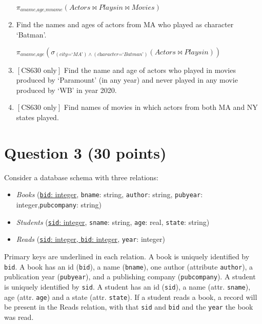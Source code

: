 \documentclass[letterpaper, 11pt]{article}
\begin{document}
\begin{enumerate}[label={\alph*})]
    $\pi_{\textit{aname,age,mname}}(\textit{Actors} \bowtie \textit{Playsin} \bowtie \textit{Movies})$
    
    \item Find the names and ages of actors from MA who played as character `Batman'.

    $\pi_{\textit{aname,age}}(\sigma_{(\textit{city=`MA'})\wedge (\textit{character=`Batman'})}(\textit{Actors} \bowtie \textit{Playsin}))$
    
    \item $\left[\text{CS630 only}\right]$ Find the name and age of actors who played in movies produced by `Paramount' (in any year) and never played in any movie produced by `WB' in year 2020.
    \item $\left[\text{CS630 only}\right]$ Find names of movies in which actors from both MA and NY states played.
\end{enumerate}

\section*{Question 3 (30 points)}

Consider a database schema with three relations:
\begin{itemize}
    \item \textit{Books} (\underline{\texttt{bid}: integer}, \texttt{bname}: string, \texttt{author}: string, \texttt{pubyear}: integer,\texttt{pubcompany}: string)
    \item \textit{Students} (\underline{\texttt{sid}: integer}, \texttt{sname}: string, \texttt{age}: real, \texttt{state}: string)
    \item \textit{Reads} (\underline{\texttt{sid}: integer, \texttt{bid}: integer}, \texttt{year}: integer)
\end{itemize}

Primary keys are underlined  in each relation. A book is uniquely identified by \texttt{bid}. A book has an id (\texttt{bid}), a name (\texttt{bname}), one author (attribute \texttt{author}), a publication year (\texttt{pubyear}), and a publishing company (\texttt{pubcompany}). A student is uniquely identified by \texttt{sid}. A student has an id (\texttt{sid}), a name (attr. \texttt{sname}), age (attr. \texttt{age}) and a state (attr. \texttt{state}). If a student reads a book, a record will be present in the Reads relation, with that \texttt{sid} and \texttt{bid} and the \texttt{year} the book was read.
\end{document}
